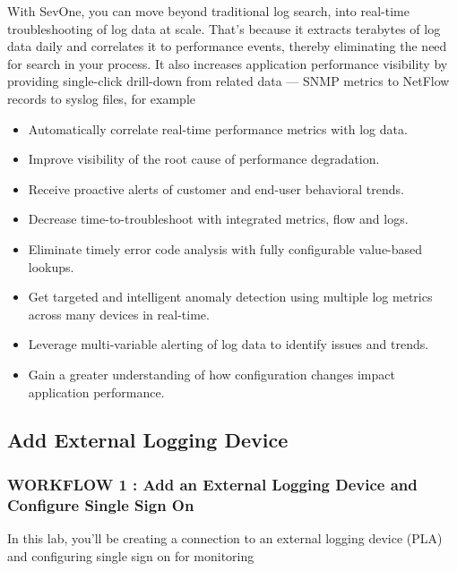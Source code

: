 \documentclass[letterpaper,10pt,english]{sphinxmanual}
\begin{document}
With SevOne, you can move beyond traditional log search, into real-time troubleshooting of log data at scale. That’s because it extracts terabytes of log data daily and correlates it to performance events, thereby eliminating the need for search in your process. It also increases application performance visibility by providing single-click drill-down from related data — SNMP metrics to NetFlow records to syslog files, for example
\begin{itemize}
\item {} 
Automatically correlate real-time performance metrics with log data.

\item {} 
Improve visibility of the root cause of performance degradation.

\item {} 
Receive proactive alerts of customer and end-user behavioral trends.

\item {} 
Decrease time-to-troubleshoot with integrated metrics, flow and logs.

\item {} 
Eliminate timely error code analysis with fully configurable
value-based lookups.

\item {} 
Get targeted and intelligent anomaly detection using multiple log
metrics across many devices in real-time.

\item {} 
Leverage multi-variable alerting of log data to identify issues and
trends.

\item {} 
Gain a greater understanding of how configuration changes impact
application performance.

\end{itemize}


\subsection{Add External Logging Device}
\label{\detokenize{class1/module6/lab1::doc}}\label{\detokenize{class1/module6/lab1:add-external-logging-device}}

\subsubsection{WORKFLOW 1 : Add an External Logging Device and Configure Single Sign On}
\label{\detokenize{class1/module6/lab1:workflow-1-add-an-external-logging-device-and-configure-single-sign-on}}
In this lab, you’ll be creating a connection to an external logging
device (PLA) and configuring single sign on for monitoring
\end{document}
